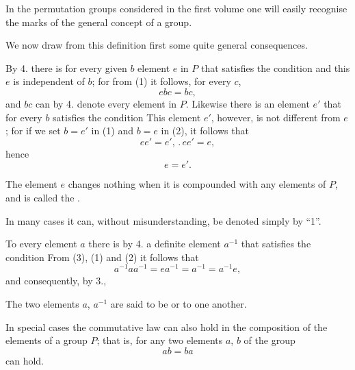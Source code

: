 
In the permutation groups considered in the first volume one will easily recognise the marks of the general concept of a group.

We now draw from this definition first some quite general consequences.

By 4. there is for every given $b$  element $e$ in $P$ that satisfies the condition
and this $e$ is independent of $b$; for from (1) it follows, for every $c$,
\[
ebc = bc,
\]
and $bc$ can by 4. denote every element in $P$. Likewise there is an element $e'$ that for every $b$ satisfies the condition
This element $e'$, however, is not different from $e$; for if we set $b = e'$ in (1) and $b = e$ in (2), it follows that
\[
e e' = e', \, . \, e e' = e, %
\]
hence
\[
e = e'.
\]

The element $e$ changes nothing when it is compounded with any elements of $P$, and is called the .

In many cases it can, without misunderstanding, be denoted simply by ``1''.

To every element $a$ there is by 4. a definite element $a^{-1}$ that satisfies the condition
From (3), (1) and (2) it follows that
\[
a^{-1} a a^{-1} = e a^{-1} = a^{-1} = a^{-1} e,
\]
and consequently, by 3.,

The two elements $a$, $a^{-1}$ are said to be  or  to one another.

In special cases the commutative law can also hold in the composition of the elements of a group $P$; that is, for any two elements $a$, $b$ of the group
\[
a b = b a
\]
can hold.
